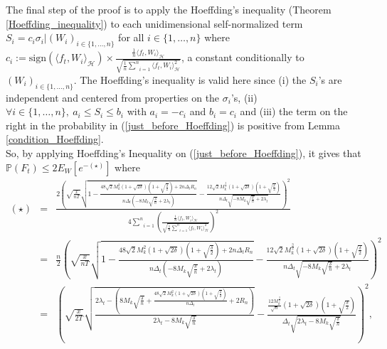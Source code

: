 \documentclass[twoside,11pt]{article}
\newcommand{\Hk}{\mathcal{H}}
\newcommand{\nb}{n}
\newcommand{\PPO}{\mathbb{P} }
\begin{document}
The final step of the proof is to apply the Hoeffding's inequality (Theorem \ref{Hoeffding_inequality}) to each unidimensional self-normalized term $S_i = c_i \sigma_i \vert \left(W_i\right)_{i \in \{1,\ldots,\nb\}}$ for all $i \in \{1,\ldots,\nb\}$ where $c_i :=  \text{sign}(\langle f_t , W_i \rangle_{\Hk}) \times \frac{\frac{1}{\nb} \langle f_t , W_i \rangle_{\Hk}}{\sqrt{\frac{1}{\nb} \underset{i=1}{\overset{\nb}{\sum}} \langle f_t , W_i \rangle_{\Hk}^2}}$, a constant conditionally to $\left(W_i\right)_{i \in \{1,\ldots,\nb\}}$. The Hoeffding's inequality is valid here since (i) the $S_i$'s are independent and centered from properties on the $\sigma_i$'s, (ii) $\forall i \in \{1,\ldots,\nb\}, \ a_i \leq S_i \leq b_i$ with $a_i =-c_i$ and $b_i =c_i$ and (iii) the term on the right in the probability in (\ref{just_before_Hoeffding}) is positive from Lemma \ref{condition_Hoeffding}. \\
So, by applying Hoeffding's Inequality on (\ref{just_before_Hoeffding}), it gives that $\PPO (F_t) \leq 2 E_W \left [e^{- (\star)} \right]$ where 
\begin{eqnarray*} 
  (\star)   &=&   \frac{2 \left(\sqrt{\frac{x}{\nb T}} \sqrt{1 - \frac{48 \sqrt{2} M_k^2 \left(1+ \sqrt{2\delta}\right) \left(1+ \sqrt{\frac{\delta}{2}}\right) + 2 \nb \Delta_t R_{\nb}}{\nb \Delta_t \left(- 8 M_k \sqrt{\frac{\delta}{\nb}} + 2 \lambda_t\right)}} - \frac{12 \sqrt{2} M_k^{\frac{3}{2}} \left(1+ \sqrt{2\delta}\right) \left(1+ \sqrt{\frac{\delta}{2}}\right)}{\nb \Delta_t \sqrt{- 8 M_k \sqrt{\frac{\delta}{\nb}} + 2 \lambda_t}} \right)^2}{4 \underset{i=1}{\overset{\nb}{\sum}} \left(\frac{\frac{1}{\nb} \langle f_t , W_i \rangle_{\Hk}}{\sqrt{\frac{1}{\nb} \underset{i=1}{\overset{\nb}{\sum}} \langle f_t , W_i \rangle_{\Hk}^2}}\right)^2} \\
   &= & \frac{\nb}{2} \left(\sqrt{\frac{x}{\nb T}} \sqrt{1 - \frac{48 \sqrt{2} M_k^2 \left(1+ \sqrt{2\delta}\right) \left(1+ \sqrt{\frac{\delta}{2}}\right) + 2 \nb \Delta_t R_{\nb}}{\nb \Delta_t \left(- 8 M_k \sqrt{\frac{\delta}{\nb}} + 2 \lambda_t\right)}} - \frac{12 \sqrt{2} M_k^{\frac{3}{2}} \left(1+ \sqrt{2\delta}\right) \left(1+ \sqrt{\frac{\delta}{2}}\right)}{\nb \Delta_t \sqrt{- 8 M_k \sqrt{\frac{\delta}{\nb}} +2  \lambda_t}} \right)^2 \\
   &= &   \left(\sqrt{\frac{x}{2T}} \sqrt{\frac{2 \lambda_t - \left( 8 M_k \sqrt{\frac{\delta}{\nb}} + \frac{48 \sqrt{2} M_k^2 \left(1+ \sqrt{2\delta}\right) \left(1+ \sqrt{\frac{\delta}{2}}\right)}{\nb \Delta_t} + 2 R_{\nb}  \right)}{2 \lambda_t - 8 M_k \sqrt{\frac{\delta}{\nb}}}} - \frac{\frac{12 M_k^{\frac{3}{2}}}{\sqrt{\nb}} \left(1+ \sqrt{2\delta}\right) \left(1+ \sqrt{\frac{\delta}{2}}\right)}{\Delta_t \sqrt{2 \lambda_t - 8 M_k \sqrt{\frac{\delta}{\nb}}}}\right)^2,
\end{eqnarray*}  
\end{document}
